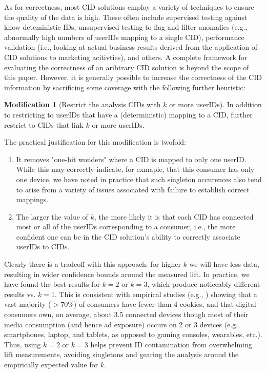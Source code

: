 \documentclass[11pt,a4paper]{article}
\theoremstyle{definition}
\theoremstyle{remark}
\theoremstyle{definition}
\theoremstyle{definition}
\theoremstyle{definition}
\theoremstyle{definition}
\theoremstyle{definition}
\newtheorem{modification}{Modification}[section]
\theoremstyle{definition}
\begin{document}
As for correctness, most CID solutions employ a variety of techniques to ensure the quality of the data is high. These often include supervised testing against know deteministic IDs, unsupervised testing to flag and filter anomalies (e.g., abnormally high numbers of userIDs mapping to a single CID), performance validation (i.e., looking at actual business results derived from the application of CID solutions to marketing acitivties), and others. A complete framework for evaluating the correctness of an aribtrary CID solution is beyond the scope of this paper. However, it is generally possible to increase the correctness of the CID information by sacrificing some coverage with the following further heuristic: 

\begin{modification}[Restrict the analysis CIDs with $k$ or more userIDs]
In addition to restricting to userIDs that have a (deterministic) mapping to a CID, further restrict to CIDs that link $k$ or more userIDs. 
\end{modification}

The practical justification for this modification is twofold: 
\begin{enumerate}
\item It removes "one-hit wonders" where a CID is mapped to only one userID. While this may correctly indicate, for exmaple, that this consumer has only one device, we have noted in practice that such singleton occurences also tend to arise from a variety of issues associated with failure to establish correct mappings. 
\item The larger the value of $k$, the more likely it is that each CID has connected most or all of the userIDs corresponding to a consumer, i.e., the more confident one can be in the CID solution's ability to correctly associate userIDs to CIDs.
\end{enumerate}

Clearly there is a tradeoff with this approach: for higher $k$ we will have less data, resulting in wider confidence bounds around the measured lift. In practice, we have found the best results for $k=2$ or $k=3$, which produce noticeably different results vs. $k=1$. This is consistent with empirical studies (e.g., \cite{coey2016people}) showing that a vast majority ($> 70\%$) of consumers have fewer than 4 cookies, and that digital consumers own, on average, about 3.5 connected devices \cite{emarketer.com_2016}
though most of their media consumption (and hence ad exposure) occurs on 2 or 3 devices (e.g., smartphones, laptop, and tablets, as opposed to gaming consoles, wearables, etc.). Thus, using $k=2$ or $k=3$ helps prevent ID contamination from overwhelming lift measurements, avoiding singletons and gearing the analysis around the empirically expected value for $k$.
\end{document}
